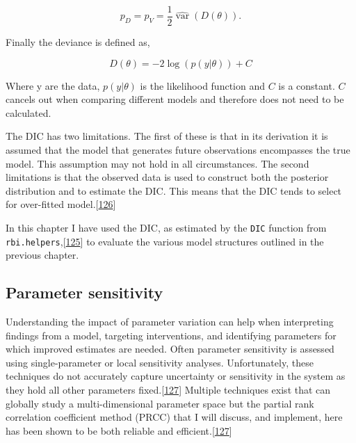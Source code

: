 \documentclass[11pt,twoside]{bristolthesis}
\begin{document}
  \[p_{D}=p_{V}={\frac  {1}{2}}\widehat {\operatorname {var}}\left(D(\theta )\right).\]
  
  Finally the deviance is defined as,
  
  \[D(\theta)=-2\log(p(y|\theta ))+C\]
  
  Where y are the data, \(\displaystyle p(y|\theta)\) is the likelihood function and \(C\) is a constant. \(C\) cancels out when comparing different models and therefore does not need to be calculated.
  
  The DIC has two limitations. The first of these is that in its derivation it is assumed that the model that generates future observations encompasses the true model. This assumption may not hold in all circumstances. The second limitations is that the observed data is used to construct both the posterior distribution and to estimate the DIC. This means that the DIC tends to select for over-fitted model.{[}\protect\hyperlink{ref-Gelman:nll_LBlw}{126}{]}
  
  In this chapter I have used the DIC, as estimated by the \texttt{DIC} function from \texttt{rbi.helpers},{[}\protect\hyperlink{ref-Funk:2019uw}{125}{]} to evaluate the various model structures outlined in the previous chapter.
  
  \hypertarget{parameter-sensitivity}{%
  \subsection{Parameter sensitivity}\label{parameter-sensitivity}}
  
  Understanding the impact of parameter variation can help when interpreting findings from a model, targeting interventions, and identifying parameters for which improved estimates are needed. Often parameter sensitivity is assessed using single-parameter or local sensitivity analyses. Unfortunately, these techniques do not accurately capture uncertainty or sensitivity in the system as they hold all other parameters fixed.{[}\protect\hyperlink{ref-Marino2009a}{127}{]} Multiple techniques exist that can globally study a multi-dimensional parameter space but the partial rank correlation coefficient method (PRCC) that I will discuss, and implement, here has been shown to be both reliable and efficient.{[}\protect\hyperlink{ref-Marino2009a}{127}{]}
  
\end{document}
